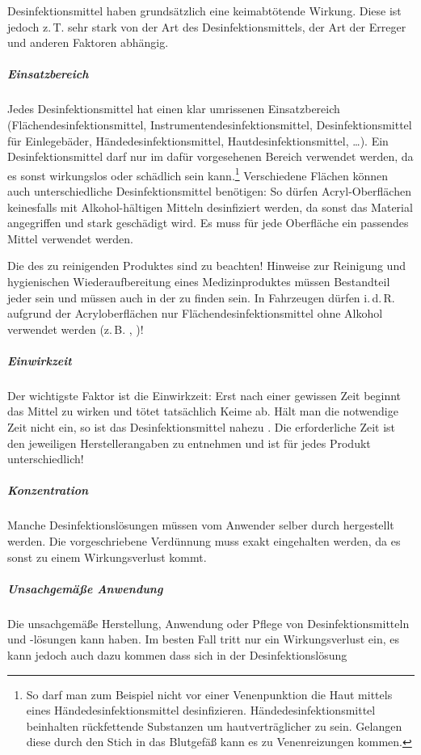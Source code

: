 {}
{%
Desinfektionsmittel haben grundsätzlich eine keimabtötende
Wirkung. Diese ist jedoch z.\,T. sehr stark von der Art des
Desinfektionsmittels, der Art der Erreger und anderen
Faktoren abhängig.

\subparagraph{Einsatzbereich} 
Jedes Desinfektionsmittel hat einen klar umrissenen
Einsatzbereich (Flächendesinfektionsmittel,
Instrumentendesinfektionsmittel, Desinfektionsmittel für
Einlegebäder, Händedesinfektionsmittel,
Hautdesinfektionsmittel, \ldots{}). Ein Desinfektionsmittel
darf nur im dafür vorgesehenen Bereich verwendet werden, da
es sonst wirkungslos oder schädlich sein kann.\footnote{So
darf man zum Beispiel nicht vor einer Venenpunktion die Haut
mittels eines Händedesinfektionsmittel desinfizieren.
Händedesinfektionsmittel beinhalten rückfettende Substanzen
um hautverträglicher zu sein. Gelangen diese durch den Stich
in das Blutgefäß kann es zu Venenreizungen kommen.}
Verschiedene Flächen können auch unterschiedliche
Desinfektionsmittel benötigen: So dürfen Acryl-Oberflächen
keinesfalls mit Alkohol-hältigen Mitteln desinfiziert werden,
da sonst das Material angegriffen und stark geschädigt wird.
Es muss für jede Oberfläche ein passendes Mittel verwendet
werden.

Die  des zu reinigenden
Produktes sind zu beachten! Hinweise zur Reinigung und
hygienischen Wiederaufbereitung eines Medizinproduktes
müssen Bestandteil  jeder  sein und müssen
auch in der  zu finden sein.
In Fahrzeugen dürfen i.\,d.\,R. aufgrund der
Acryloberflächen nur Flächendesinfektionsmittel ohne Alkohol
verwendet werden (z.\,B. ,
)!


\subparagraph{Einwirkzeit} Der wichtigste Faktor ist die
Einwirkzeit: Erst nach einer gewissen Zeit beginnt das Mittel
zu wirken und tötet tatsächlich Keime ab. Hält man die
notwendige Zeit nicht ein, so ist das Desinfektionsmittel
nahezu . Die erforderliche Zeit ist den
jeweiligen Herstellerangaben zu entnehmen und ist für jedes
Produkt unterschiedlich!

\subparagraph{Konzentration} Manche Desinfektionslösungen
müssen vom Anwender selber durch  hergestellt werden.  Die vorgeschriebene
Verdünnung muss exakt eingehalten werden, da es sonst zu
einem Wirkungsverlust kommt.


\subparagraph{Unsachgemäße Anwendung} Die unsachgemäße
Herstellung, Anwendung oder Pflege von Desinfektionsmitteln
und -lösungen kann  haben. Im besten
Fall tritt nur ein Wirkungsverlust ein, es kann jedoch auch
dazu kommen dass sich in der Desinfektionslösung

}
